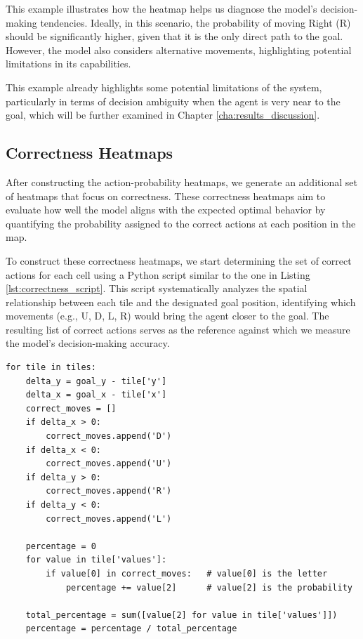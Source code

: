 This example illustrates how the heatmap helps us diagnose the model’s decision-making
tendencies. Ideally, in this scenario, the probability of moving Right (R)
should be significantly higher, given that it is the only direct path to the goal.
However, the model also considers alternative movements, highlighting potential
limitations in its capabilities.

This example already highlights some potential limitations of the system, particularly
in terms of decision ambiguity when the agent is very near to the goal, which
will be further examined in Chapter \ref{cha:results_discussion}.

\subsection{Correctness Heatmaps}
\label{sub:correctness_heatmaps}

After constructing the action-probability heatmaps, we generate an additional
set of heatmaps that focus on correctness. These correctness heatmaps aim to evaluate
how well the model aligns with the expected optimal behavior by quantifying the probability
assigned to the correct actions at each position in the map.

To construct these correctness heatmaps, we start determining the set of correct
actions for each cell using a Python script similar to the one in Listing
\ref{lst:correctness_script}. This script systematically analyzes the spatial relationship
between each tile and the designated goal position, identifying which movements
(e.g., U, D, L, R) would bring the agent closer to the goal. The resulting list
of correct actions serves as the reference against which we measure the model's
decision-making accuracy.

\vspace{5mm}
\begin{codewindow}
    \begin{lstlisting}
for tile in tiles:
    delta_y = goal_y - tile['y']
    delta_x = goal_x - tile['x']
    correct_moves = []
    if delta_x > 0:
        correct_moves.append('D')
    if delta_x < 0:
        correct_moves.append('U')
    if delta_y > 0:
        correct_moves.append('R')
    if delta_y < 0:
        correct_moves.append('L')

    percentage = 0
    for value in tile['values']:
        if value[0] in correct_moves:   # value[0] is the letter
            percentage += value[2]      # value[2] is the probability

    total_percentage = sum([value[2] for value in tile['values']])
    percentage = percentage / total_percentage
\end{lstlisting}
\end{codewindow}
\vspace{5mm}

